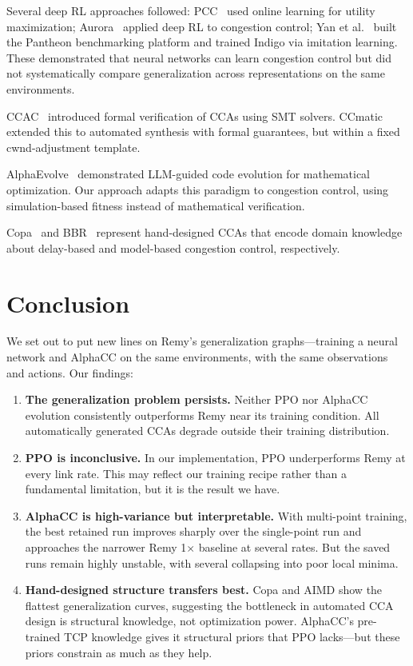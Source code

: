 Several deep RL approaches followed: PCC~\cite{dong2015pcc} used online
learning for utility maximization; Aurora~\cite{jay2019deep} applied deep RL
to congestion control; Yan et al.~\cite{yan2018pantheon} built the Pantheon
benchmarking platform and trained Indigo via imitation learning.
These demonstrated that neural networks can learn congestion control but
did not systematically compare generalization across representations on the
same environments.

CCAC~\cite{arun2021ccac} introduced formal verification of CCAs using SMT
solvers. CCmatic~\cite{arun2024ccmatic} extended this to automated synthesis
with formal guarantees, but within a fixed cwnd-adjustment template.

AlphaEvolve~\cite{alphaevolve2025} demonstrated LLM-guided code evolution for
mathematical optimization. Our approach adapts this paradigm to congestion
control, using simulation-based fitness instead of mathematical verification.

Copa~\cite{arun2018copa} and BBR~\cite{cardwell2017bbr} represent hand-designed
CCAs that encode domain knowledge about delay-based and model-based congestion
control, respectively.


\section{Conclusion}

We set out to put new lines on Remy's generalization graphs---training a
neural network and AlphaCC on the same environments,
with the same observations and actions. Our findings:

\begin{enumerate}
\item \textbf{The generalization problem persists.} Neither PPO nor AlphaCC
  evolution consistently outperforms Remy near its training condition. All
  automatically generated CCAs degrade outside their training distribution.

\item \textbf{PPO is inconclusive.} In our implementation, PPO underperforms
  Remy at every link rate. This may reflect our training recipe rather than a
  fundamental limitation, but it is the result we have.

\item \textbf{AlphaCC is high-variance but interpretable.} With
  multi-point training, the best retained run improves sharply over the
  single-point run and approaches the narrower Remy 1$\times$ baseline at
  several rates. But the saved runs remain highly unstable, with several
  collapsing into poor local minima.

\item \textbf{Hand-designed structure transfers best.} Copa and AIMD show
  the flattest generalization curves, suggesting the bottleneck in automated
  CCA design is structural knowledge, not optimization power. AlphaCC's
  pre-trained TCP knowledge gives it structural priors that PPO
  lacks---but these priors constrain as much as they help.
\end{enumerate}
